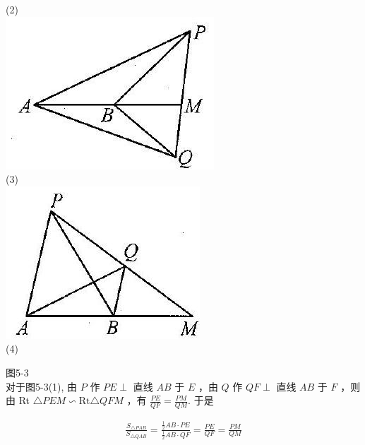 \documentclass[10pt]{article}
\begin{document}
(2)\\
\includegraphics[max width=\textwidth, center]{2024_10_30_2c8f45efd4a519b08e1ag-048(2)}\\
(3)\\
\includegraphics[max width=\textwidth, center]{2024_10_30_2c8f45efd4a519b08e1ag-048(1)}\\
(4)

图5-3\\
对于图5-3(1), 由 $P$ 作 $P E \perp$ 直线 $A B$ 于 $E$ ，由 $Q$ 作 $Q F \perp$ 直线 $A B$ 于 $F$ ，则由 Rt $\triangle P E M \backsim \mathrm{Rt} \triangle Q F M$ ，有 $\frac{P E}{Q F}=\frac{P M}{Q M}$. 于是

\begin{align*}
\frac{S_{\triangle P A B}}{S_{\triangle Q A B}}=\frac{\frac{1}{2} A B \cdot P E}{\frac{1}{2} A B \cdot Q F}=\frac{P E}{Q F}=\frac{P M}{Q M}
\end{align*}
\end{document}

